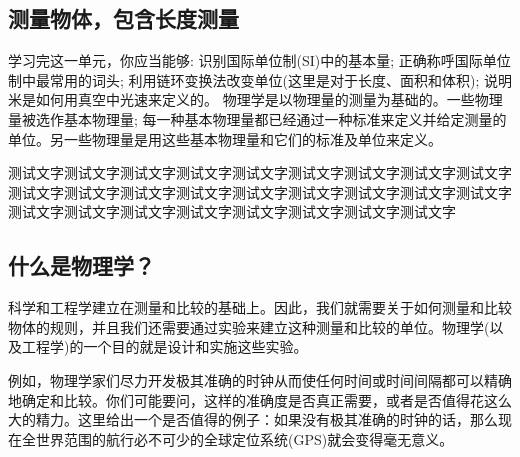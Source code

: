 



\begin{Project}

\section{测量物体，包含长度测量}

\begin{Point*}
	学习完这一单元，你应当能够: 识别国际单位制(SI)中的基本量; 正确称呼国际单位制中最常用的词头; 利用链环变换法改变单位(这里是对于长度、面积和体积); 说明米是如何用真空中光速来定义的。
	\tcblower
	物理学是以物理量的测量为基础的。一些物理量被选作基本物理量; 每一种基本物理量都已经通过一种标准来定义并给定测量的单位。另一些物理量是用这些基本物理量和它们的标准及单位来定义。
%	
%	
%
\end{Point*}

测试文字测试文字测试文字测试文字测试文字测试文字测试文字测试文字测试文字测试文字测试文字测试文字测试文字测试文字测试文字测试文字测试文字测试文字测试文字测试文字测试文字测试文字测试文字测试文字测试文字测试文字
\makeatletter
\makeatother


%



\begin{Paracol}
	\subsection{什么是物理学？}

	
	科学和工程学建立在测量和比较的基础上。因此，我们就需要关于如何测量和比较物体的规则，并且我们还需要通过实验来建立这种测量和比较的单位。物理学(以及工程学)的一个目的就是设计和实施这些实验。
	
	例如，物理学家们尽力开发极其准确的时钟从而使任何时间或时间间隔都可以精确地确定和比较。你们可能要问，这样的准确度是否真正需要，或者是否值得花这么大的精力。这里给出一个是否值得的例子：如果没有极其准确的时钟的话，那么现在全世界范围的航行必不可少的全球定位系统(GPS)就会变得毫无意义。
	

\end{Paracol}
\end{Project}

